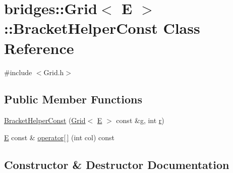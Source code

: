 \hypertarget{classbridges_1_1_grid_1_1_bracket_helper_const}{}\section{bridges\+::Grid$<$ E $>$\+::Bracket\+Helper\+Const Class Reference}
\label{classbridges_1_1_grid_1_1_bracket_helper_const}


{\ttfamily \#include $<$Grid.\+h$>$}

\subsection*{Public Member Functions}
\begin{DoxyCompactItemize}
\item 
\mbox{\hyperlink{classbridges_1_1_grid_1_1_bracket_helper_const_a7ae889b338baf5f86f0fffcccbcc70ed}{Bracket\+Helper\+Const}} (\mbox{\hyperlink{classbridges_1_1_grid}{Grid}}$<$ \mbox{\hyperlink{namespacebridges_acfb0a4f7877d8f63de3e6862004c50eda3a3ea00cfc35332cedf6e5e9a32e94da}{E}} $>$ const \&\mbox{\hyperlink{namespacebridges_acfb0a4f7877d8f63de3e6862004c50edab2f5ff47436671b6e533d8dc3614845d}{g}}, int \mbox{\hyperlink{namespacebridges_acfb0a4f7877d8f63de3e6862004c50eda4b43b0aee35624cd95b910189b3dc231}{r}})
\item 
\mbox{\hyperlink{namespacebridges_acfb0a4f7877d8f63de3e6862004c50eda3a3ea00cfc35332cedf6e5e9a32e94da}{E}} const  \& \mbox{\hyperlink{classbridges_1_1_grid_1_1_bracket_helper_const_aef4accf6080a14a2146e13bd42dc9553}{operator\mbox{[}$\,$\mbox{]}}} (int col) const
\end{DoxyCompactItemize}


\subsection{Constructor \& Destructor Documentation}
\mbox{\label{classbridges_1_1_grid_1_1_bracket_helper_const_a7ae889b338baf5f86f0fffcccbcc70ed}} 
